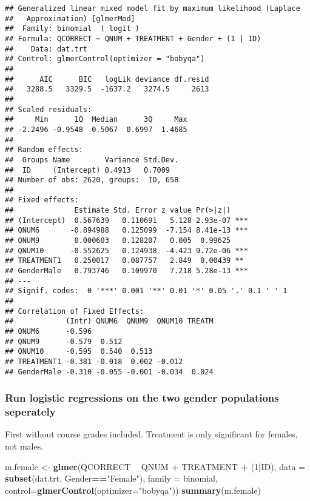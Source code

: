 \documentclass[]{article}
\newenvironment{Shaded}{\begin{snugshade}}{\end{snugshade}}
\newcommand{\KeywordTok}[1]{\textcolor[rgb]{0.13,0.29,0.53}{\textbf{#1}}}
\newcommand{\DataTypeTok}[1]{\textcolor[rgb]{0.13,0.29,0.53}{#1}}
\newcommand{\DecValTok}[1]{\textcolor[rgb]{0.00,0.00,0.81}{#1}}
\newcommand{\StringTok}[1]{\textcolor[rgb]{0.31,0.60,0.02}{#1}}
\newcommand{\OperatorTok}[1]{\textcolor[rgb]{0.81,0.36,0.00}{\textbf{#1}}}
\newcommand{\NormalTok}[1]{#1}
\begin{document}
\begin{verbatim}
## Generalized linear mixed model fit by maximum likelihood (Laplace
##   Approximation) [glmerMod]
##  Family: binomial  ( logit )
## Formula: QCORRECT ~ QNUM + TREATMENT + Gender + (1 | ID)
##    Data: dat.trt
## Control: glmerControl(optimizer = "bobyqa")
## 
##      AIC      BIC   logLik deviance df.resid 
##   3288.5   3329.5  -1637.2   3274.5     2613 
## 
## Scaled residuals: 
##     Min      1Q  Median      3Q     Max 
## -2.2496 -0.9548  0.5067  0.6997  1.4685 
## 
## Random effects:
##  Groups Name        Variance Std.Dev.
##  ID     (Intercept) 0.4913   0.7009  
## Number of obs: 2620, groups:  ID, 658
## 
## Fixed effects:
##              Estimate Std. Error z value Pr(>|z|)    
## (Intercept)  0.567639   0.110691   5.128 2.93e-07 ***
## QNUM6       -0.894988   0.125099  -7.154 8.41e-13 ***
## QNUM9        0.000603   0.128207   0.005  0.99625    
## QNUM10      -0.552625   0.124938  -4.423 9.72e-06 ***
## TREATMENT1   0.250017   0.087757   2.849  0.00439 ** 
## GenderMale   0.793746   0.109970   7.218 5.28e-13 ***
## ---
## Signif. codes:  0 '***' 0.001 '**' 0.01 '*' 0.05 '.' 0.1 ' ' 1
## 
## Correlation of Fixed Effects:
##            (Intr) QNUM6  QNUM9  QNUM10 TREATM
## QNUM6      -0.596                            
## QNUM9      -0.579  0.512                     
## QNUM10     -0.595  0.540  0.513              
## TREATMENT1 -0.381 -0.018  0.002 -0.012       
## GenderMale -0.310 -0.055 -0.001 -0.034  0.024
\end{verbatim}

\subsubsection{Run logistic regressions on the two gender populations
seperately}\label{run-logistic-regressions-on-the-two-gender-populations-seperately}

First without course grades included. Treatment is only significant for
females, not males.

\begin{Shaded}
\begin{Highlighting}[]
\NormalTok{m.female <-}\StringTok{ }\KeywordTok{glmer}\NormalTok{(QCORRECT }\OperatorTok{~}\StringTok{ }\NormalTok{QNUM }\OperatorTok{+}\StringTok{ }\NormalTok{TREATMENT }\OperatorTok{+}\StringTok{ }\NormalTok{(}\DecValTok{1}\OperatorTok{|}\NormalTok{ID), }
                \DataTypeTok{data =} \KeywordTok{subset}\NormalTok{(dat.trt, Gender}\OperatorTok{==}\StringTok{"Female"}\NormalTok{), }
                \DataTypeTok{family =}\NormalTok{ binomial, }\DataTypeTok{control=}\KeywordTok{glmerControl}\NormalTok{(}\DataTypeTok{optimizer=}\StringTok{"bobyqa"}\NormalTok{))}
\KeywordTok{summary}\NormalTok{(m.female)}
\end{Highlighting}
\end{Shaded}
\end{document}
